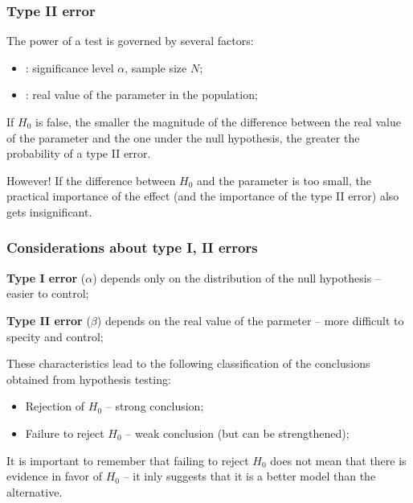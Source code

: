 \documentclass[10pt]{beamer}
\begin{document}
\begin{frame}
  \frametitle{Type II error}
  
  The power of a test is governed by several factors:
  \begin{itemize}
    \item {}: significance level $\alpha$, sample size $N$;
    \item {}: real value of the parameter in the population;
  \end{itemize}
  If $H_0$ is false, the smaller the magnitude of the difference
  between the real value of the parameter and the one under the null
  hypothesis, the greater the probability of a type II error.

  \vspace{1.5cm}

  \begin{alertblock}{However!}
    If the difference between $H_0$ and the parameter is too small,
    the practical importance of the effect (and the importance of the
    type II error) also gets insignificant.
  \end{alertblock}
\end{frame}

\begin{frame}
  \frametitle{Considerations about type I, II errors} 

  {\bf Type I error} ($\alpha$) depends only on the distribution of
  the null hypothesis -- easier to control;
  
  \smallskip

  {\bf Type II error} ($\beta$) depends on the real value of the
  parmeter -- more difficult to specity and control;

  \bigskip

  These characteristics lead to the following classification of the
  conclusions obtained from hypothesis testing:
  \begin{block}{}
    \begin{itemize}
    \item Rejection of $H_0$ -- strong conclusion;
    \item Failure to reject $H_0$ -- weak conclusion (but can be strengthened);
    \end{itemize}
  \end{block}

  It is important to remember that failing to reject $H_0$ does not
  mean that there is evidence in favor of $H_0$ -- it inly suggests
  that it is a better model than the alternative.

\end{frame}
\end{document}
